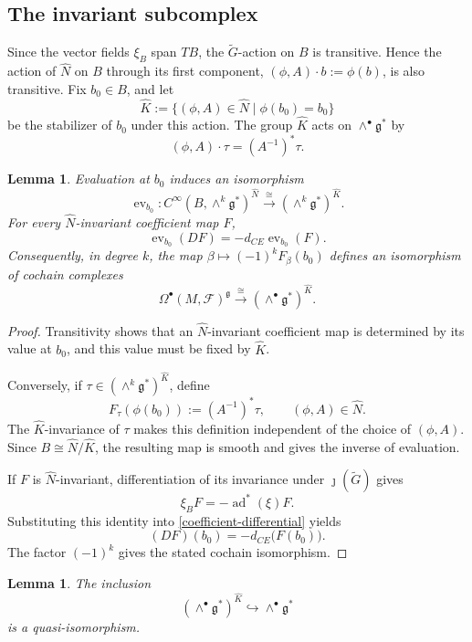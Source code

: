 \documentclass[reqno, 11pt]{amsart}
\newtheorem{lem}[thm]{Lemma}
\theoremstyle{definition}
\theoremstyle{property}
\theoremstyle{remark}
\numberwithin{equation}{section}
\begin{document}
\subsection{The invariant subcomplex}

Since the vector fields $\xi_B$ span $TB$, the $\widetilde G$-action on
$B$ is transitive. Hence the action of $\widehat N$ on $B$ through its first
component,
$
(\phi,A)\cdot b:=\phi(b)$, 
is also transitive. Fix $b_0\in B$, and let
\[
\widehat K
:=
\{(\phi,A)\in\widehat N\mid\phi(b_0)=b_0\}
\]
be the stabilizer of $b_0$ under this action. The group $\widehat K$ acts on
$\wedge^\bullet\mathfrak g^*$ by
\[
(\phi,A)\cdot\tau=(A^{-1})^*\tau.
\]

\begin{lem}\label{invariant-coefficient-complex}
Evaluation at $b_0$ induces an isomorphism
\[
\operatorname{ev}_{b_0}:
C^\infty(B,\wedge^k\mathfrak g^*)^{\widehat N}
\xrightarrow{\;\cong\;}
(\wedge^k\mathfrak g^*)^{\widehat K}.
\]
For every $\widehat N$-invariant coefficient map $F$,
\[
\operatorname{ev}_{b_0}(DF)
=
-d_{CE}\operatorname{ev}_{b_0}(F).
\]
Consequently, in degree $k$, the map
$
\beta\longmapsto(-1)^kF_\beta(b_0)$ 
defines an isomorphism of cochain complexes
\[
\Omega^\bullet(M,\mathcal F)^{\mathfrak g}
\xrightarrow{\;\cong\;}
(\wedge^\bullet\mathfrak g^*)^{\widehat K}.
\]
\end{lem}

\begin{proof}
Transitivity shows that an $\widehat N$-invariant coefficient map is
determined by its value at $b_0$, and this value must be fixed by
$\widehat K$.

Conversely, if
$\tau\in(\wedge^k\mathfrak g^*)^{\widehat K}$, define
\[
F_\tau(\phi(b_0))
:=
(A^{-1})^*\tau,
\qquad
(\phi,A)\in\widehat N.
\]
The $\widehat K$-invariance of $\tau$ makes this definition independent of
the choice of $(\phi,A)$. Since $B\cong\widehat N/\widehat K$, the resulting
map is smooth and gives the inverse of evaluation.

If $F$ is $\widehat N$-invariant, differentiation of its invariance under
$\jmath(\widetilde G)$ gives
\[
\xi_BF=-\operatorname{ad}^*(\xi)F.
\]
Substituting this identity into \eqref{coefficient-differential} yields
\[
(DF)(b_0)
=
-d_{CE}\bigl(F(b_0)\bigr).
\]
The factor $(-1)^k$ gives the stated cochain isomorphism.
\end{proof}

\begin{lem}\label{stabilizer-quasi-isomorphism}
The inclusion
\[
(\wedge^\bullet\mathfrak g^*)^{\widehat K}
\hookrightarrow
\wedge^\bullet\mathfrak g^*
\]
is a quasi-isomorphism.
\end{lem}
\end{document}

